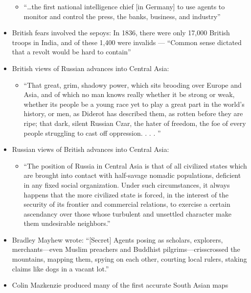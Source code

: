 \begin{itemize}
\begin{itemize}
      \item ``\ldots the first national intelligence chief [in Germany] to use agents to monitor and control the press, the banks, business, and industry''

    \end{itemize}

  \item British fears involved the sepoys: In 1836, there were only 17,000 British troops in India, and of these 1,400 were invalids — ``Common sense dictated that a revolt would be hard to contain''

  \item British views of Russian advances into Central Asia:

    \begin{itemize}

      \item ``That great, grim, shadowy power, which sits brooding over Europe and Asia, and of which no man knows really whether it be strong or weak, whether its people be a young race yet to play a great part in the world's history, or men, as Diderot has described them, as rotten before they are ripe; that dark, silent Russian Czar, the hater of freedom, the foe of every people struggling to cast off oppression. . . . ''

    \end{itemize}

  \item Russian views of British advances into Central Asia:

    \begin{itemize}

      \item ``The position of Russia in Central Asia is that of all civilized states which are brought into contact with half-savage nomadic populations, deficient in any fixed social organization. Under such circumstances, it always happens that the more civilized state is forced, in the interest of the security of its frontier and commercial relations, to exercise a certain ascendancy over those whose turbulent and unsettled character make them undesirable neighbors.''

    \end{itemize}

  \item Bradley Mayhew wrote: “[Secret] Agents posing as scholars, explorers, merchants—even Muslim preachers and Buddhist pilgrims—crisscrossed the mountains, mapping them, spying on each other, courting local rulers, staking claims like dogs in a vacant lot.”

  \item Colin Mazkenzie produced many of the first accurate South Asian maps 

\end{itemize}



